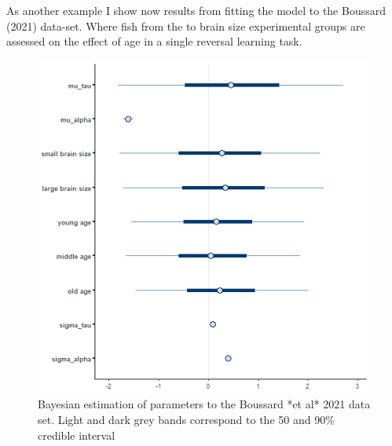 \documentclass[
]{article}
\begin{document}
As another example I show now results from fitting the model to the
Boussard (2021) data-set. Where fish from the to brain size experimental
groups are assessed on the effect of age in a single reversal learning
task.

\begin{figure}

\includegraphics[width=6.67in,]{images/boussard2intervals_tau_alpha} \hfill{}

\caption{Bayesian estimation of parameters to the Boussard *et al* 2021 data set. Light and dark grey bands correspond to the 50 and 90\% credible interval}\label{fig:unnamed-chunk-16}
\end{figure}
\end{document}
